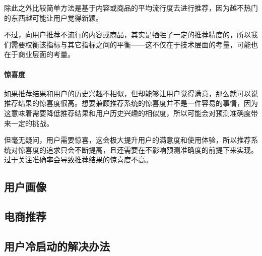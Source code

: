 除此之外比较简单方法是基于内容或商品的平均流行度去进行推荐，因为越不热门的东西越可能让用户觉得新颖。

不过，向用户推荐不流行的内容或商品，其实是牺牲了一定的推荐精度的，所以我们需要权衡该指标与其它指标之间的平衡——这不仅在于技术层面的考量，可能也在于商业层面的考量。

\paragraph{惊喜度}如果推荐结果和用户的历史兴趣不相似，但却能够让用户觉得满意，那么就可以说推荐结果的惊喜度很高。想要兼顾推荐系统的惊喜度并不是一件容易的事情，因为这意味着需要降低推荐结果和用户历史兴趣的相似度，所以可能会对预测准确度带来一定的挑战。

但毫无疑问，用户需要惊喜，这会极大提升用户的满意度和使用体验，所以推荐系统对惊喜度的追求只会不断提高，且还需要在不影响预测准确度的前提下来实现。过于关注准确率会导致推荐结果的惊喜度不高。


\subsection{用户画像}

\subsection{电商推荐}

\subsection{用户冷启动的解决办法}
